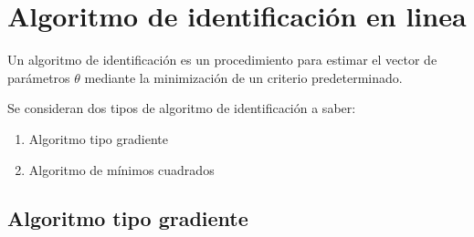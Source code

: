 
    \newpage
    \section{Algoritmo de identificación en linea}

        Un algoritmo de identificación es un procedimiento para estimar el vector de parámetros $\theta$ mediante la minimización de un criterio predeterminado.

        Se consideran dos tipos de algoritmo de identificación a saber:

        \begin{enumerate}
            \item Algoritmo tipo gradiente
            \item Algoritmo de mínimos cuadrados
        \end{enumerate}


        \subsection{Algoritmo tipo gradiente}

